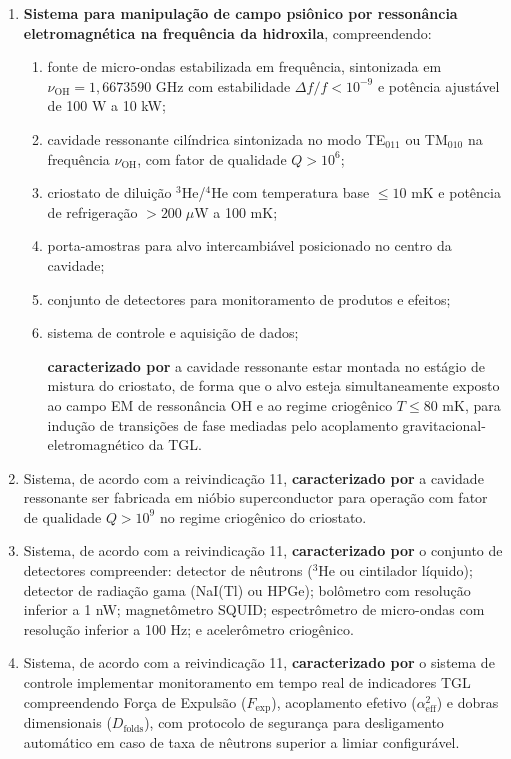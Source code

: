 \documentclass[12pt,a4paper]{article}
\newcommand{\alphaii}{\alpha^2}
\newcommand{\Dfolds}{D_{\text{folds}}}
\newcommand{\Fexp}{F_{\text{exp}}}
\newcommand{\nuOH}{\nu_{\text{OH}}}
\begin{document}
\begin{enumerate}

\item \textbf{Sistema para manipulação de campo psiônico por
ressonância eletromagnética na frequência da hidroxila},
compreendendo:
  \begin{enumerate}[label=(\alph*)]
  \item fonte de micro-ondas estabilizada em frequência,
  sintonizada em $\nuOH = 1{,}6673590$ GHz com estabilidade
  $\Delta f / f < 10^{-9}$ e potência ajustável de 100 W a
  10 kW;
  \item cavidade ressonante cilíndrica sintonizada no modo
  TE$_{011}$ ou TM$_{010}$ na frequência $\nuOH$, com fator
  de qualidade $Q > 10^6$;
  \item criostato de diluição $^3$He/$^4$He com temperatura
  base $\leq 10$ mK e potência de refrigeração $> 200\;\mu$W
  a 100 mK;
  \item porta-amostras para alvo intercambiável posicionado
  no centro da cavidade;
  \item conjunto de detectores para monitoramento de produtos
  e efeitos;
  \item sistema de controle e aquisição de dados;

  \textbf{caracterizado por} a cavidade ressonante estar montada
  no estágio de mistura do criostato, de forma que o alvo esteja
  simultaneamente exposto ao campo EM de ressonância OH e ao
  regime criogênico $T \leq 80$ mK, para indução de transições
  de fase mediadas pelo acoplamento gravitacional-eletromagnético
  da TGL.
  \end{enumerate}


\item Sistema, de acordo com a reivindicação 11,
\textbf{caracterizado por} a cavidade ressonante ser
fabricada em nióbio superconductor para operação com fator de
qualidade $Q > 10^9$ no regime criogênico do criostato.

\item Sistema, de acordo com a reivindicação 11,
\textbf{caracterizado por} o conjunto de detectores
compreender: detector de nêutrons ($^3$He ou cintilador
líquido); detector de radiação gama (NaI(Tl) ou HPGe);
bolômetro com resolução inferior a 1 nW; magnetômetro SQUID;
espectrômetro de micro-ondas com resolução inferior a 100 Hz;
e acelerômetro criogênico.

\item Sistema, de acordo com a reivindicação 11,
\textbf{caracterizado por} o sistema de controle implementar
monitoramento em tempo real de indicadores TGL compreendendo
Força de Expulsão ($\Fexp$), acoplamento efetivo
($\alphaii_{\text{eff}}$) e dobras dimensionais ($\Dfolds$),
com protocolo de segurança para desligamento automático em
caso de taxa de nêutrons superior a limiar configurável.


\end{enumerate}
\end{document}
